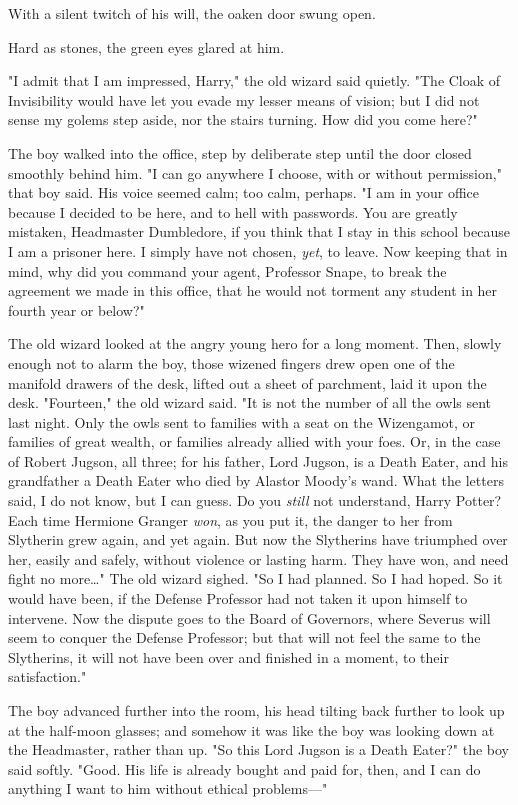 With a silent twitch of his will, the oaken door swung open.

Hard as stones, the green eyes glared at him.

"I admit that I am impressed, Harry," the old wizard said quietly. "The Cloak 
of Invisibility would have let you evade my lesser means of vision; but I did 
not sense my golems step aside, nor the stairs turning. How did you come here?"

The boy walked into the office, step by deliberate step until the door closed 
smoothly behind him. "I can go anywhere I choose, with or without permission," 
that boy said. His voice seemed calm; too calm, perhaps. "I am in your office 
because I decided to be here, and to hell with passwords. You are greatly 
mistaken, Headmaster Dumbledore, if you think that I stay in this school 
because I am a prisoner here. I simply have not chosen, \emph{yet}, to leave. 
Now keeping that in mind, why did you command your agent, Professor Snape, to 
break the agreement we made in this office, that he would not torment any 
student in her fourth year or below?"

The old wizard looked at the angry young hero for a long moment. Then, slowly 
enough not to alarm the boy, those wizened fingers drew open one of the 
manifold drawers of the desk, lifted out a sheet of parchment, laid it upon the 
desk. "Fourteen," the old wizard said. "It is not the number of all the owls 
sent last night. Only the owls sent to families with a seat on the Wizengamot, 
or families of great wealth, or families already allied with your foes. Or, in 
the case of Robert Jugson, all three; for his father, Lord Jugson, is a Death 
Eater, and his grandfather a Death Eater who died by Alastor Moody's wand. What 
the letters said, I do not know, but I can guess. Do you \emph{still} not 
understand, Harry Potter? Each time Hermione Granger \emph{won}, as you put it, 
the danger to her from Slytherin grew again, and yet again. But now the 
Slytherins have triumphed over her, easily and safely, without violence or 
lasting harm. They have won, and need fight no more{\ldots}" The old wizard 
sighed. "So I had planned. So I had hoped. So it would have been, if the 
Defense Professor had not taken it upon himself to intervene. Now the dispute 
goes to the Board of Governors, where Severus will seem to conquer the Defense 
Professor; but that will not feel the same to the Slytherins, it will not have 
been over and finished in a moment, to their satisfaction."

The boy advanced further into the room, his head tilting back further to look 
up at the half-moon glasses; and somehow it was like the boy was looking down 
at the Headmaster, rather than up. "So this Lord Jugson is a Death Eater?" the 
boy said softly. "Good. His life is already bought and paid for, then, and I 
can do anything I want to him without ethical problems---"

